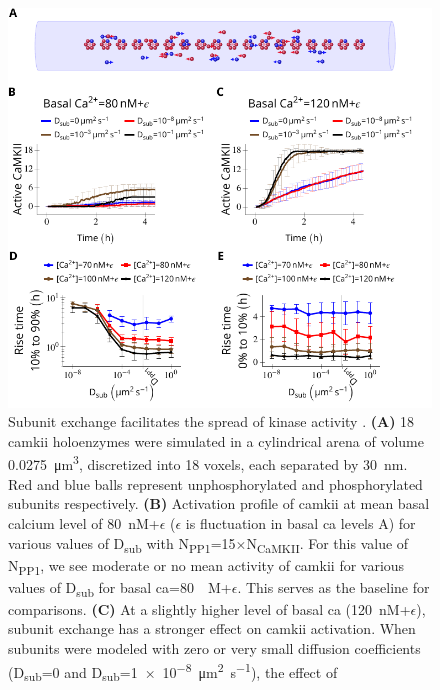 \documentclass[9pt,lineno,doublespacing]{elife}
\newcommand\SUB[2]{#1\textsubscript{#2}}
\begin{document}
\begin{figure}
    \includegraphics[width=0.95\linewidth]{./PaperFigures/elifeFigure4/figure_camkii_activation_130mm.pdf}
    \caption{Subunit exchange facilitates the spread of kinase activity
        \citep{stratton_activation-triggered_2014}. \textbf{(A)} 18 \gls{camkii}
        holoenzymes were simulated in a cylindrical arena of volume
        \SI{0.0275}{\cubic\micro\meter}, discretized into 18 voxels, each
        separated by \SI{30}{\nano\meter}. Red and blue balls represent
        unphosphorylated and phosphorylated subunits respectively.
        \textbf{(B)} Activation profile of \gls{camkii} at mean basal calcium
        level of \SI{80}{\nano M}+$\epsilon$ ($\epsilon$ is fluctuation in basal
        \gls{ca} levels A) for various values of \SUB{D}{sub}
        with \SUB{N}{PP1}=15$\times$\SUB{N}{CaMKII}. For this value of
        \SUB{N}{PP1}, we see moderate or no mean activity of \gls{camkii} for
        various values of \SUB{D}{sub} for basal \gls{ca}=\SI{80}{\nano
        M}+$\epsilon$. This serves as the baseline for comparisons.
        \textbf{(C)} At a slightly higher level of basal \gls{ca}
        (\SI{120}{\nano M}+$\epsilon$), subunit exchange has a stronger effect
        on \gls{camkii} activation. When subunits were modeled with zero or very
        small diffusion coefficients (\SUB{D}{sub}=0 and
        \SUB{D}{sub}=\SI{1e-8}{\micro\meter\squared\per\second}), the effect of
}
\end{figure}
\end{document}

